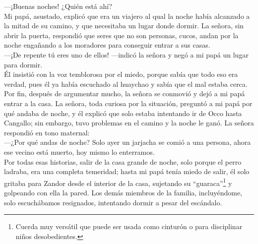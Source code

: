 ---¡Buenas noches! ¿Quién está ahí?\\\indent
Mi papá, asustado, explicó que era un viajero al qual la noche había alcanzado a la mitad de su camino, y que necesitaba un lugar donde dormir. 
La señora, sin abrir la puerta, respondió que seres que no son personas, cucos, andan por la noche engañando a los moradores para conseguir entrar a sus casas.\\\indent
---¡De repente tú eres uno de ellos! ---indicó la señora y negó a mi papá un lugar para dormir. \\\indent
Él insistió con la voz temblorosa por el miedo, porque sabía que todo eso era verdad, pues él ya había escuchado al huaychao y sabía que el mal estaba cerca. Por fin, después de argumentar mucho, la señora se conmovió y dejó a mi papá entrar a la casa.
La señora, toda curiosa por la situación, preguntó a mi papá por qué andaba de noche, y él explicó que solo estaba intentando ir de Occo hasta Cangallo; sin embargo, tuvo problemas en el camino y la noche le ganó. 
La señora respondió en tono maternal:\\\indent 
---¿Por qué andas de noche? Solo ayer un jarjacha se comió a una persona, ahora ese vecino está muerto, hoy mismo lo enterramos.\\\indent
Por todas esas historias, salir de la casa grande de noche, solo porque el perro ladraba, era una completa temeridad; hasta mi papá tenía miedo de salir, él solo gritaba para Zandor desde el interior de la casa, sujetando su ``guaraca''\footnote{Cuerda muy versátil que puede ser usada como cinturón o para disciplinar niños desobedientes.} y golpeando con ella la pared.
Los demás miembros de la familia, incluyéndome, solo escuchábamos resignados, intentando dormir a pesar del escándalo.

